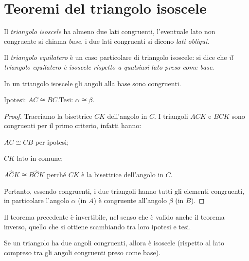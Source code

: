 \section{Teoremi del triangolo isoscele}

Il \emph{triangolo isoscele} ha almeno due lati congruenti, l'eventuale lato non congruente si chiama \emph{base}, i due lati congruenti si dicono \emph{lati obliqui}.

Il \emph{triangolo equilatero} è un caso particolare di triangolo isoscele: si dice che \emph{il triangolo equilatero è isoscele rispetto a qualsiasi lato preso come base}.

\begin{teorema}
In un triangolo isoscele gli angoli alla base sono congruenti.
\end{teorema}

\begin{figure}[htb]
\centering
\end{figure}

\noindent Ipotesi: $AC\cong BC$.\tab Tesi: $\alpha\cong \beta$.

\begin{proof}
Tracciamo la bisettrice $CK$ dell'angolo in $C$.
I triangoli $ACK$ e $BCK$ sono congruenti per il primo criterio, infatti hanno:
\begin{itemize*}
\item $AC\cong CB$ per ipotesi;
\item $CK$ lato in comune;
\item $A\widehat{C}K\cong B\widehat{C}K$ perché $CK$ è la bisettrice dell'angolo in $C$.
\end{itemize*}
Pertanto, essendo congruenti, i due triangoli hanno tutti gli elementi congruenti, in particolare l'angolo $\alpha$ (in $A$) è congruente all'angolo $\beta$ (in $B$).
\end{proof}

Il teorema precedente è invertibile, nel senso che è valido anche il teorema inverso, quello che si ottiene scambiando tra loro ipotesi e tesi.

\begin{teorema}
Se un triangolo ha due angoli congruenti, allora è isoscele (rispetto al lato compreso tra gli angoli congruenti preso come base).
\end{teorema}

\begin{figure}[htb]
\centering
\end{figure}

